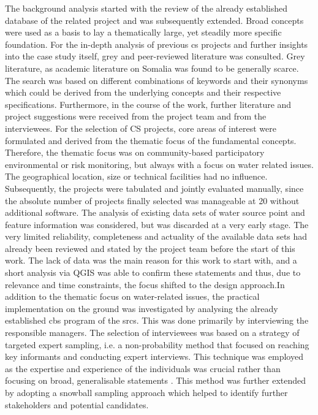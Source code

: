 The background analysis started with the review of the already established database of the related project and was subsequently extended. Broad concepts were used as a basis to lay a thematically large, yet steadily more specific foundation. For the in-depth analysis of previous \acrshort*{cs} projects and further insights into the case study itself, grey and peer-reviewed literature was consulted. Grey literature, as academic literature on Somalia was found to be generally scarce. The search was based on different combinations of keywords and their synonyms which could be derived from the underlying concepts and their respective specifications. Furthermore, in the course of the work, further literature and project suggestions were received from the project team and from the interviewees. For the selection of CS projects, core areas of interest were formulated and derived from the thematic focus of the fundamental concepts. Therefore, the thematic focus was on community-based participatory environmental or risk monitoring, but always with a focus on water related issues. The geographical location, size or technical facilities had no influence. Subsequently, the projects were tabulated and jointly evaluated manually, since the absolute number of projects finally selected was manageable at 20 without additional software.\linebreak[1]
The analysis of existing data sets of water source point and feature information was considered, but was discarded at a very early stage. The very limited reliability, completeness and actuality of the available data sets had already been reviewed and stated by the project team before the start of this work. The lack of data was the main reason for this work to start with, and a short analysis via QGIS was able to confirm these statements and thus, due to relevance and time constraints, the focus shifted to the design approach.\linebreak[0]
In addition to the thematic focus on water-related issues, the practical implementation on the ground was investigated by analysing the already established \acrshort*{cbs} program of the \acrshort*{srcs}. This was done primarily by interviewing the responsible managers.
The selection of interviewees was based on a strategy of targeted expert sampling, i.e. a non-probability method that focused on reaching key informants and conducting expert interviews. This technique was employed as the expertise and experience of the individuals was crucial rather than focusing on broad, generalisable statements \autocite{pelzResearchMethodsSocial}. This method was further extended by adopting a snowball sampling approach which helped to identify further stakeholders and potential candidates.\linebreak[1]
